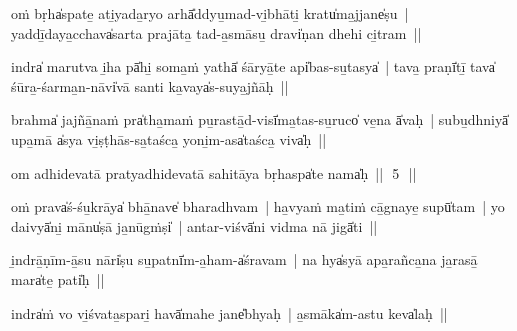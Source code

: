 \documentclass[parskip, DIV=14]{scrartcl}
\begin{document}
{%
oṁ bṛha̍spate̱ ati̱yada̱ryo arhā̎ddyu̱mad-vi̱bhāti̱ kratu̍ma̱jjane̍ṣu~| yaddī̱daya̱cchava̍sarta prajāta̱ tad-a̱smāsu̱ dravi̍ṇan dhehi ci̱tram~||


indra̍ marutva i̱ha pā̍hi̱ soma̱ṁ yathā̍ śāryā̱te api̍bas-su̱tasya̍~| tava̱ praṇī̍tī̱ tava̍ śūra̱-śarma̱n-nāvi̍vā santi ka̱vaya̍s-suya̱jñāḥ~||


brahma̍ jajñā̱naṁ pra̍tha̱maṁ pu̱rastā̱d-visī̍ma̱tas-su̱ruco̍ ve̱na ā̍vaḥ~| subu̱dhniyā̍ upa̱mā a̍sya vi̱ṣṭhās-sa̱taśca̱ yoni̱m-asa̍taśca̱ viva̍ḥ~||


om adhidevatā pratyadhidevatā sahitāya bṛha॒spa̍te॒ nama̍ḥ~||~\,5\,~||
\vspace{0.5cm}


oṁ prava̍ś-śu̱krāya̍ bhā̱nave̍ bharadhvam~| ha̱vyaṁ ma̱tiṁ cā̱gnaye̱ supū̍tam~| yo daivyā̍ni̱ mānu̍ṣā ja̱nūgṁṣi̍~| a॒ntar-viśvā̍ni vi॒dma nā॒ jigā̍ti~||


i̱ndrā̱ṇīm-ā̱su nāri̍ṣu su̱patnī̍m-a̱ham-a̍śravam~| na hya̍syā apa̱rañca̱na ja̱rasā̱ mara̍te̱ pati̍ḥ~||


indra̍ṁ vo vi̱śvata̱spari̱ havā̍mahe॒ jane̎bhyaḥ~| a̱smāka̍m-astu keva̍laḥ~||


}
\end{document}
